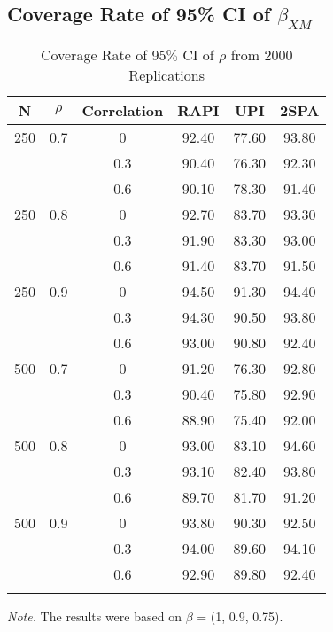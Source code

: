 \documentclass[
  man]{apa7}
\begin{document}
\hypertarget{coverage-rate-of-95-ci-of-beta_xm}{%
\subsection{\texorpdfstring{Coverage Rate of 95\% CI of \(\beta_{XM}\)}{Coverage Rate of 95\% CI of \textbackslash beta\_\{XM\}}}\label{coverage-rate-of-95-ci-of-beta_xm}}

\begin{table}[tbp]

\begin{center}
\begin{threeparttable}

\caption{\label{tab:unnamed-chunk-3}Coverage Rate of 95$\%$ CI of $\rho$ from 2000 Replications}

\begin{tabular}{cccccc}
\toprule
N & \multicolumn{1}{c}{$\rho$} & \multicolumn{1}{c}{Correlation} & \multicolumn{1}{c}{RAPI} & \multicolumn{1}{c}{UPI} & \multicolumn{1}{c}{2SPA}\\
\midrule
250 & 0.7 & 0 & 92.40 & 77.60 & 93.80\\
 &  & 0.3 & 90.40 & 76.30 & 92.30\\
 &  & 0.6 & 90.10 & 78.30 & 91.40\\
250 & 0.8 & 0 & 92.70 & 83.70 & 93.30\\
 &  & 0.3 & 91.90 & 83.30 & 93.00\\
 &  & 0.6 & 91.40 & 83.70 & 91.50\\
250 & 0.9 & 0 & 94.50 & 91.30 & 94.40\\
 &  & 0.3 & 94.30 & 90.50 & 93.80\\
 &  & 0.6 & 93.00 & 90.80 & 92.40\\
500 & 0.7 & 0 & 91.20 & 76.30 & 92.80\\
 &  & 0.3 & 90.40 & 75.80 & 92.90\\
 &  & 0.6 & 88.90 & 75.40 & 92.00\\
500 & 0.8 & 0 & 93.00 & 83.10 & 94.60\\
 &  & 0.3 & 93.10 & 82.40 & 93.80\\
 &  & 0.6 & 89.70 & 81.70 & 91.20\\
500 & 0.9 & 0 & 93.80 & 90.30 & 92.50\\
 &  & 0.3 & 94.00 & 89.60 & 94.10\\
 &  & 0.6 & 92.90 & 89.80 & 92.40\\
\bottomrule
\addlinespace
\end{tabular}

\begin{tablenotes}[para]
\normalsize{\textit{Note.} The results were based on $\beta$ = (1, 0.9, 0.75).}
\end{tablenotes}

\end{threeparttable}
\end{center}

\end{table}
\end{document}
